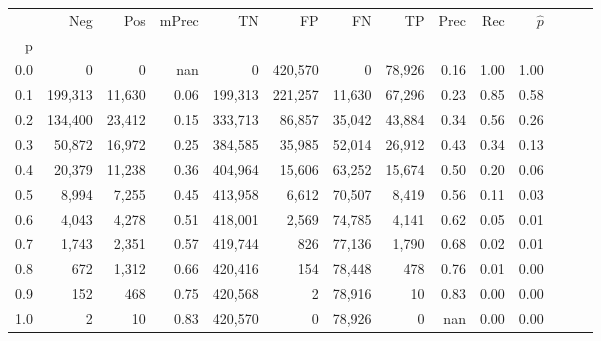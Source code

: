 \begin{tabular}{rrrrrrrrrrrrrr}
\toprule
{} &      Neg &     Pos & mPrec &       TN &       FP &      FN &      TP &  Prec &   Rec & $\hat{p}$ \\
p   &          &         &       &          &          &         &         &       &       &           \\
\midrule
0.0 &        0 &       0 &   nan &        0 &  420,570 &       0 &  78,926 &  0.16 &  1.00 &      1.00 \\
0.1 &  199,313 &  11,630 &  0.06 &  199,313 &  221,257 &  11,630 &  67,296 &  0.23 &  0.85 &      0.58 \\
0.2 &  134,400 &  23,412 &  0.15 &  333,713 &   86,857 &  35,042 &  43,884 &  0.34 &  0.56 &      0.26 \\
0.3 &   50,872 &  16,972 &  0.25 &  384,585 &   35,985 &  52,014 &  26,912 &  0.43 &  0.34 &      0.13 \\
0.4 &   20,379 &  11,238 &  0.36 &  404,964 &   15,606 &  63,252 &  15,674 &  0.50 &  0.20 &      0.06 \\
0.5 &    8,994 &   7,255 &  0.45 &  413,958 &    6,612 &  70,507 &   8,419 &  0.56 &  0.11 &      0.03 \\
0.6 &    4,043 &   4,278 &  0.51 &  418,001 &    2,569 &  74,785 &   4,141 &  0.62 &  0.05 &      0.01 \\
0.7 &    1,743 &   2,351 &  0.57 &  419,744 &      826 &  77,136 &   1,790 &  0.68 &  0.02 &      0.01 \\
0.8 &      672 &   1,312 &  0.66 &  420,416 &      154 &  78,448 &     478 &  0.76 &  0.01 &      0.00 \\
0.9 &      152 &     468 &  0.75 &  420,568 &        2 &  78,916 &      10 &  0.83 &  0.00 &      0.00 \\
1.0 &        2 &      10 &  0.83 &  420,570 &        0 &  78,926 &       0 &   nan &  0.00 &      0.00 \\
\bottomrule
\end{tabular}
